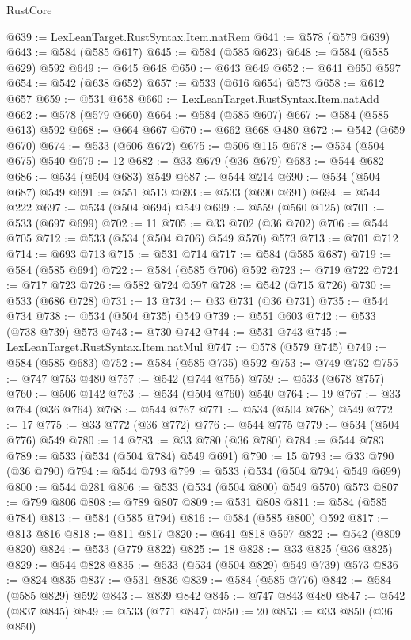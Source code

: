 \begin{lexlean}{RustCore}
\begin{coremodule}
@639 := LexLeanTarget.RustSyntax.Item.natRem
@641 := @578 (@579 @639)
@643 := @584 (@585 @617)
@645 := @584 (@585 @623)
@648 := @584 (@585 @629) @592
@649 := @645 @648
@650 := @643 @649
@652 := @641 @650 @597
@654 := @542 (@638 @652)
@657 := @533 (@616 @654) @573
@658 := @612 @657
@659 := @531 @658
@660 := LexLeanTarget.RustSyntax.Item.natAdd
@662 := @578 (@579 @660)
@664 := @584 (@585 @607)
@667 := @584 (@585 @613) @592
@668 := @664 @667
@670 := @662 @668 @480
@672 := @542 (@659 @670)
@674 := @533 (@606 @672)
@675 := @506 @115
@678 := @534 (@504 @675) @540
@679 := 12
@682 := @33 @679 (@36 @679)
@683 := @544 @682
@686 := @534 (@504 @683) @549
@687 := @544 @214
@690 := @534 (@504 @687) @549
@691 := @551 @513
@693 := @533 (@690 @691)
@694 := @544 @222
@697 := @534 (@504 @694) @549
@699 := @559 (@560 @125)
@701 := @533 (@697 @699)
@702 := 11
@705 := @33 @702 (@36 @702)
@706 := @544 @705
@712 := @533 (@534 (@504 @706) @549 @570) @573
@713 := @701 @712
@714 := @693 @713
@715 := @531 @714
@717 := @584 (@585 @687)
@719 := @584 (@585 @694)
@722 := @584 (@585 @706) @592
@723 := @719 @722
@724 := @717 @723
@726 := @582 @724 @597
@728 := @542 (@715 @726)
@730 := @533 (@686 @728)
@731 := 13
@734 := @33 @731 (@36 @731)
@735 := @544 @734
@738 := @534 (@504 @735) @549
@739 := @551 @603
@742 := @533 (@738 @739) @573
@743 := @730 @742
@744 := @531 @743
@745 := LexLeanTarget.RustSyntax.Item.natMul
@747 := @578 (@579 @745)
@749 := @584 (@585 @683)
@752 := @584 (@585 @735) @592
@753 := @749 @752
@755 := @747 @753 @480
@757 := @542 (@744 @755)
@759 := @533 (@678 @757)
@760 := @506 @142
@763 := @534 (@504 @760) @540
@764 := 19
@767 := @33 @764 (@36 @764)
@768 := @544 @767
@771 := @534 (@504 @768) @549
@772 := 17
@775 := @33 @772 (@36 @772)
@776 := @544 @775
@779 := @534 (@504 @776) @549
@780 := 14
@783 := @33 @780 (@36 @780)
@784 := @544 @783
@789 := @533 (@534 (@504 @784) @549 @691)
@790 := 15
@793 := @33 @790 (@36 @790)
@794 := @544 @793
@799 := @533 (@534 (@504 @794) @549 @699)
@800 := @544 @281
@806 := @533 (@534 (@504 @800) @549 @570) @573
@807 := @799 @806
@808 := @789 @807
@809 := @531 @808
@811 := @584 (@585 @784)
@813 := @584 (@585 @794)
@816 := @584 (@585 @800) @592
@817 := @813 @816
@818 := @811 @817
@820 := @641 @818 @597
@822 := @542 (@809 @820)
@824 := @533 (@779 @822)
@825 := 18
@828 := @33 @825 (@36 @825)
@829 := @544 @828
@835 := @533 (@534 (@504 @829) @549 @739) @573
@836 := @824 @835
@837 := @531 @836
@839 := @584 (@585 @776)
@842 := @584 (@585 @829) @592
@843 := @839 @842
@845 := @747 @843 @480
@847 := @542 (@837 @845)
@849 := @533 (@771 @847)
@850 := 20
@853 := @33 @850 (@36 @850)

\end{coremodule}
\end{lexlean}
